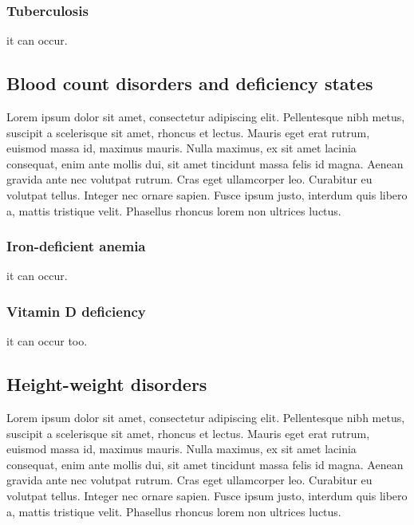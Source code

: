 \subsubsection{Tuberculosis}\label{sub:tbc} it can occur.

\subsection{Blood count disorders and deficiency states}\label{sub:bloodcountdisorders}
Lorem ipsum dolor sit amet, consectetur adipiscing elit. Pellentesque nibh metus, suscipit a scelerisque sit amet, rhoncus et lectus. Mauris eget erat rutrum, euismod massa id, maximus mauris. Nulla maximus, ex sit amet lacinia consequat, enim ante mollis dui, sit amet tincidunt massa felis id magna. Aenean gravida ante nec volutpat rutrum. Cras eget ullamcorper leo. Curabitur eu volutpat tellus. Integer nec ornare sapien. Fusce ipsum justo, interdum quis libero a, mattis tristique velit. Phasellus rhoncus lorem non ultrices luctus.


\subsubsection{Iron-deficient anemia}\label{sub:iron-deficiency} it can occur.

\subsubsection{Vitamin D deficiency}\label{sub:vitaminddeficiency} it can occur too.

\subsection{Height-weight disorders}\label{sub:heightweightdisorders}
Lorem ipsum dolor sit amet, consectetur adipiscing elit. Pellentesque nibh metus, suscipit a scelerisque sit amet, rhoncus et lectus. Mauris eget erat rutrum, euismod massa id, maximus mauris. Nulla maximus, ex sit amet lacinia consequat, enim ante mollis dui, sit amet tincidunt massa felis id magna. Aenean gravida ante nec volutpat rutrum. Cras eget ullamcorper leo. Curabitur eu volutpat tellus. Integer nec ornare sapien. Fusce ipsum justo, interdum quis libero a, mattis tristique velit. Phasellus rhoncus lorem non ultrices luctus.

